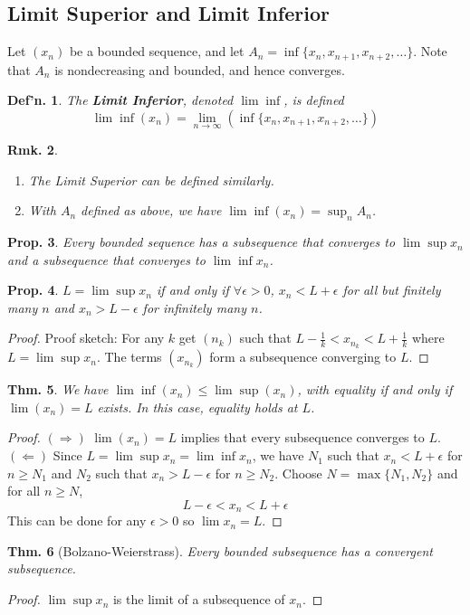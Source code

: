 \documentclass[12pt, a4paper]{book}
\newtheorem{theorem}{Thm.}[section]
\newtheorem{definition}[theorem]{Def'n.}
\newtheorem{proposition}[theorem]{Prop.}
\newtheorem{remark}[theorem]{Rmk.}
\theoremstyle{nonumberplain}
\newtheorem{proof}{Proof}
\begin{document}
\subsection{Limit Superior and Limit Inferior}
Let $(x_n)$ be a bounded sequence, and let $A_n=\inf\{x_n,x_{n+1},x_{n+2},\ldots\}$. Note that $A_n$ is nondecreasing
and bounded, and hence converges.
\begin{definition}
    The \textbf{Limit Inferior}, denoted $\lim\inf$, is defined
    \[\lim\inf (x_n)=\lim_{n\to\infty}\left(\inf\{x_n,x_{n+1},x_{n+2},\ldots\}\right)\]
\end{definition}
\begin{remark}\hspace{1cm}
    \begin{enumerate}
        \item The Limit Superior can be defined similarly.
        \item With $A_n$ defined as above, we have $\lim\inf(x_n)=\sup_n A_n$.
    \end{enumerate}
\end{remark}
\begin{proposition}
    Every bounded sequence has a subsequence that converges to $\lim\sup x_n$ and a subsequence that converges to
    $\lim\inf x_n$.
\end{proposition}
\begin{proposition}
    $L=\lim\sup x_n$ if and only if $\forall\epsilon>0$, $x_n<L+\epsilon$ for all but finitely many $n$ and $x_n>L-\epsilon$
    for infinitely many $n$.
\end{proposition}
\begin{proof}
    Proof sketch: For any $k$ get $(n_k)$ such that $L-\frac{1}{k}<x_{n_k}<L+\frac{1}{k}$ where $L=\lim\sup x_n$. The terms $(x_{n_k})$
    form a subsequence converging to $L$.
\end{proof}
\begin{theorem}
    We have $\lim\inf(x_n)\leq\lim\sup(x_n)$, with equality if and only if $\lim(x_n)=L$ exists. In this case, equality
    holds at $L$.
\end{theorem}
\begin{proof}
    $(\Rightarrow)$ $\lim(x_n)=L$ implies that every subsequence converges to $L$.
    $(\Leftarrow)$ Since $L=\lim\sup x_n=\lim\inf x_n$, we have $N_1$ such that $x_n<L+\epsilon$ for $n\geq N_1$
    and $N_2$ such that $x_n>L-\epsilon$ for $n\geq N_2$. Choose $N=\max\{N_1,N_2\}$ and for all $n\geq N$,
    \[L-\epsilon<x_n<L+\epsilon\]
    This can be done for any $\epsilon>0$ so $\lim x_n=L$.
\end{proof}
\begin{theorem}[Bolzano-Weierstrass]
    Every bounded subsequence has a convergent subsequence.
\end{theorem}
\begin{proof}
    $\lim\sup x_n$ is the limit of a subsequence of $x_n$.
\end{proof}
\end{document}
